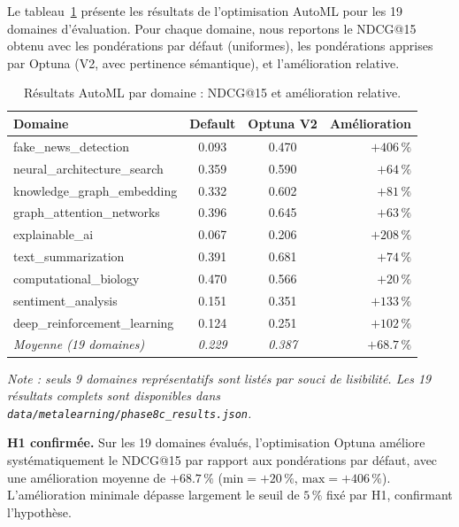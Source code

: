 Le tableau~\ref{tab:automl_results} présente les résultats de l'optimisation
AutoML pour les 19 domaines d'évaluation. Pour chaque domaine, nous
reportons le NDCG@15 obtenu avec les pondérations par défaut (uniformes),
les pondérations apprises par Optuna (V2, avec pertinence sémantique),
et l'amélioration relative.

\begin{table}[htbp]
  \centering
  \caption{Résultats AutoML par domaine : NDCG@15 et amélioration relative.}
  \label{tab:automl_results}
  \begin{tabular}{lccr}
    \toprule
    \textbf{Domaine} & \textbf{Default} & \textbf{Optuna V2} & \textbf{Amélioration} \\
    \midrule
    fake\_news\_detection  & 0.093 & 0.470 & $+406\,\%$ \\
    neural\_architecture\_search & 0.359 & 0.590 & $+64\,\%$ \\
    knowledge\_graph\_embedding & 0.332 & 0.602 & $+81\,\%$ \\
    graph\_attention\_networks & 0.396 & 0.645 & $+63\,\%$ \\
    explainable\_ai & 0.067 & 0.206 & $+208\,\%$ \\
    text\_summarization & 0.391 & 0.681 & $+74\,\%$ \\
    computational\_biology & 0.470 & 0.566 & $+20\,\%$ \\
    sentiment\_analysis & 0.151 & 0.351 & $+133\,\%$ \\
    deep\_reinforcement\_learning & 0.124 & 0.251 & $+102\,\%$ \\
    \textit{Moyenne (19 domaines)} & \textit{0.229} & \textit{0.387} & \textit{$+68.7\,\%$} \\
    \bottomrule
  \end{tabular}
  \small{\textit{Note : seuls 9 domaines représentatifs sont listés par souci de lisibilité.
  Les 19 résultats complets sont disponibles dans \texttt{data/metalearning/phase8c\_results.json}.}}
\end{table}

\begin{resultbox}
  \textbf{H1 confirmée.} Sur les 19 domaines évalués, l'optimisation Optuna
  améliore systématiquement le NDCG@15 par rapport aux pondérations par défaut,
  avec une amélioration moyenne de $+68.7\,\%$ ($\text{min} = +20\,\%$,
  $\text{max} = +406\,\%$). L'amélioration minimale dépasse largement le
  seuil de $5\,\%$ fixé par H1, confirmant l'hypothèse.
\end{resultbox}

